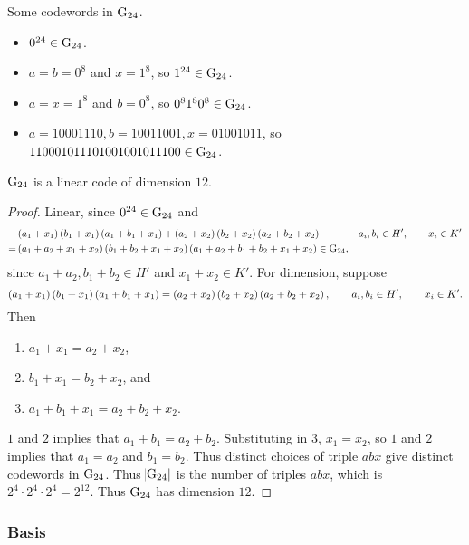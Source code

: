\begin{example*}
Some codewords in $ \mathrm{G}_{24} $.
\begin{itemize}
\item $ 0^{24} \in \mathrm{G}_{24} $.
\item $ a = b = 0^8 $ and $ x = 1^8 $, so $ 1^{24} \in \mathrm{G}_{24} $.
\item $ a = x = 1^8 $ and $ b = 0^8 $, so $ 0^81^80^8 \in \mathrm{G}_{24} $.
\item $ a = 10001110, b = 10011001, x = 01001011 $, so $ 110001011101001001011100 \in \mathrm{G}_{24} $.
\end{itemize}
\end{example*}

\begin{proposition}
$ \mathrm{G}_{24} $ is a linear code of dimension $ 12 $.
\end{proposition}

\begin{proof}
Linear, since $ 0^{24} \in \mathrm{G}_{24} $ and
\begin{align*}
& \br{a_1 + x_1}\br{b_1 + x_1}\br{a_1 + b_1 + x_1} + \br{a_2 + x_2}\br{b_2 + x_2}\br{a_2 + b_2 + x_2} & a_i, b_i \in H', \qquad x_i \in K' \\
= & \br{a_1 + a_2 + x_1 + x_2}\br{b_1 + b_2 + x_1 + x_2}\br{a_1 + a_2 + b_1 + b_2 + x_1 + x_2} \in \G_{24},
\end{align*}
since $ a_1 + a_2, b_1 + b_2 \in H' $ and $ x_1 + x_2 \in K' $. For dimension, suppose
$$ \br{a_1 + x_1}\br{b_1 + x_1}\br{a_1 + b_1 + x_1} = \br{a_2 + x_2}\br{b_2 + x_2}\br{a_2 + b_2 + x_2}, \qquad a_i, b_i \in H', \qquad x_i \in K'. $$
Then
\begin{enumerate}
\item $ a_1 + x_1 = a_2 + x_2 $,
\item $ b_1 + x_1 = b_2 + x_2 $, and
\item $ a_1 + b_1 + x_1 = a_2 + b_2 + x_2 $.
\end{enumerate}
$ 1 $ and $ 2 $ implies that $ a_1 + b_1 = a_2 + b_2 $. Substituting in $ 3 $, $ x_1 = x_2 $, so $ 1 $ and $ 2 $ implies that $ a_1 = a_2 $ and $ b_1 = b_2 $. Thus distinct choices of triple $ abx $ give distinct codewords in $ \mathrm{G}_{24} $. Thus $ \abs{\mathrm{G}_{24}} $ is the number of triples $ abx $, which is $ 2^4 \cdot 2^4 \cdot 2^4 = 2^{12} $. Thus $ \mathrm{G}_{24} $ has dimension $ 12 $.
\end{proof}

\pagebreak

\subsubsection{Basis}

